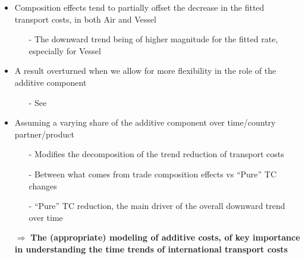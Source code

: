 \documentclass[10 pt,Helvetica, french]{beamer}
\begin{document}
\begin{frame}
\begin{itemize}

\item Composition effects tend to partially offset the decrease in the fitted transport costs, in both Air and Vessel \vspace{0.1cm}
\begin{itemize}
\item[-] The downward trend being of higher magnitude for the fitted rate, especially for Vessel
\end{itemize}
\end{itemize}
\end{frame}


\begin{frame}[label = slide_compeffects_results]
\begin{itemize}
\item A result overturned when we allow for more flexibility in the role of the additive component  \vspace{0.1cm}
\begin{itemize}
\item[-] See \hyperlink{slide_compeffects_figure}{} \vspace{0.1cm}
\end{itemize}
\pause
\item Assuming a varying share of the additive component over time/country partner/product  \vspace{0.1cm}

\begin{itemize}
\item[-] Modifies the decomposition of the trend reduction of transport costs \vspace{0.1cm}
\item[-] Between what comes from trade composition effects vs ``Pure'' TC changes \vspace{0.1cm}
\item[-] ``Pure'' TC reduction, the main driver of the overall downward trend over time \vspace{0.1cm}
\end{itemize}

\pause

\item[$\Rightarrow$] \textbf{The (appropriate) modeling of additive costs, of key importance in understanding the time trends of international transport costs}
\end{itemize}
\end{frame}
\end{document}
